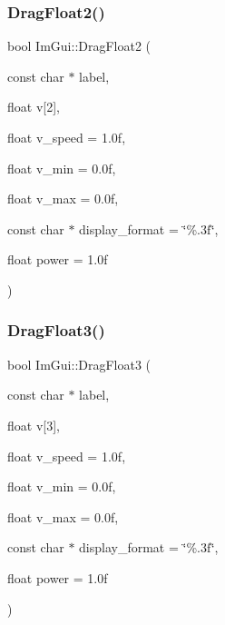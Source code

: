 \subsubsection{\texorpdfstring{Drag\+Float2()}{DragFloat2()}}
{\footnotesize\ttfamily bool Im\+Gui\+::\+Drag\+Float2 (\begin{DoxyParamCaption}\item[{const char $\ast$}]{label,  }\item[{float}]{v\mbox{[}2\mbox{]},  }\item[{float}]{v\+\_\+speed = {\ttfamily 1.0f},  }\item[{float}]{v\+\_\+min = {\ttfamily 0.0f},  }\item[{float}]{v\+\_\+max = {\ttfamily 0.0f},  }\item[{const char $\ast$}]{display\+\_\+format = {\ttfamily \char`\"{}\%.3f\char`\"{}},  }\item[{float}]{power = {\ttfamily 1.0f} }\end{DoxyParamCaption})}

\hypertarget{namespace_im_gui_a3a365703646c6fb5357f21a13c531bfe}{}\label{namespace_im_gui_a3a365703646c6fb5357f21a13c531bfe} 
\subsubsection{\texorpdfstring{Drag\+Float3()}{DragFloat3()}}
{\footnotesize\ttfamily bool Im\+Gui\+::\+Drag\+Float3 (\begin{DoxyParamCaption}\item[{const char $\ast$}]{label,  }\item[{float}]{v\mbox{[}3\mbox{]},  }\item[{float}]{v\+\_\+speed = {\ttfamily 1.0f},  }\item[{float}]{v\+\_\+min = {\ttfamily 0.0f},  }\item[{float}]{v\+\_\+max = {\ttfamily 0.0f},  }\item[{const char $\ast$}]{display\+\_\+format = {\ttfamily \char`\"{}\%.3f\char`\"{}},  }\item[{float}]{power = {\ttfamily 1.0f} }\end{DoxyParamCaption})}

\hypertarget{namespace_im_gui_a6dfd9e5d7adc6106e9391fc971d2f8bc}{}\label{namespace_im_gui_a6dfd9e5d7adc6106e9391fc971d2f8bc} 
